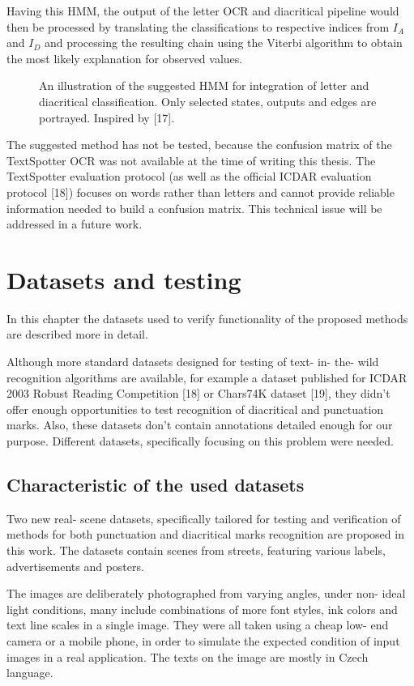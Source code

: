 \documentclass[12pt,a4paper]{report}
\begin{document}
Having this HMM, the output of the letter OCR and diacritical pipeline would then be processed by translating the classifications to respective indices from $I_{A}$ and $I_{D}$ and processing the resulting chain using the Viterbi algorithm to obtain the most likely explanation for observed values.

\begin{figure}[htbp]
    \centering
    \caption{An illustration of the suggested HMM for integration of letter and diacritical classification. Only selected states, outputs and edges are portrayed. Inspired by [17].}
    \label{fig:hmm}
\end{figure}

The suggested method has not be tested, because the confusion matrix of the TextSpotter OCR was not available at the time of writing this thesis. The TextSpotter evaluation protocol (as well as the official ICDAR evaluation protocol [18]) focuses on words rather than letters and cannot provide reliable information needed to build a confusion matrix. This technical issue will be addressed in a future work.

\chapter{Datasets and testing}
In this chapter the datasets used to verify functionality of the proposed methods are described more in detail.

Although more standard datasets designed for testing of text- in- the- wild recognition algorithms are available, for example a dataset published for ICDAR 2003 Robust Reading Competition [18] or Chars74K dataset [19], they didn't offer enough opportunities to test recognition of diacritical and punctuation marks. Also, these datasets don't contain annotations detailed enough for our purpose. Different datasets, specifically focusing on this problem were needed.

\section{Characteristic of the used datasets}
Two new real- scene datasets, specifically tailored for testing and verification of methods for both punctuation and diacritical marks recognition are proposed in this work. The datasets contain scenes from streets, featuring various labels, advertisements and posters.

The images are deliberately photographed from varying angles, under non- ideal light conditions, many include combinations of more font styles, ink colors and text line scales in a single image. They were all taken using a cheap low- end camera or a mobile phone, in order to simulate the expected condition of input images in a real application. The texts on the image are mostly in Czech language.
\end{document}
